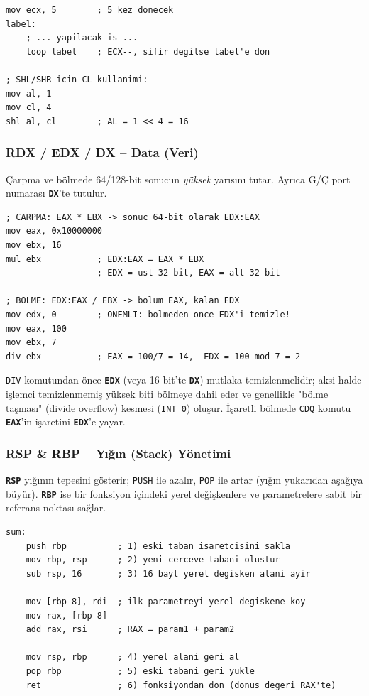 \documentclass[11pt,a4paper]{article}
\newcommand{\reg}[1]{\texttt{\color{anaMavi}\textbf{#1}}}
\newcommand{\hx}[1]{\texttt{\color{turuncu}#1}}
\newcommand{\kod}[1]{\texttt{\color{koyuGri}#1}}
\begin{document}
\begin{lstlisting}
mov ecx, 5        ; 5 kez donecek
label:
    ; ... yapilacak is ...
    loop label    ; ECX--, sifir degilse label'e don

; SHL/SHR icin CL kullanimi:
mov al, 1
mov cl, 4
shl al, cl        ; AL = 1 << 4 = 16
\end{lstlisting}

\subsubsection{RDX / EDX / DX -- Data (Veri)}
Çarpma ve bölmede 64/128-bit sonucun \emph{yüksek} yarısını tutar. Ayrıca
G/Ç port numarası \reg{DX}'te tutulur.

\begin{ornekkutu}
\begin{lstlisting}
; CARPMA: EAX * EBX -> sonuc 64-bit olarak EDX:EAX
mov eax, 0x10000000
mov ebx, 16
mul ebx           ; EDX:EAX = EAX * EBX
                  ; EDX = ust 32 bit, EAX = alt 32 bit

; BOLME: EDX:EAX / EBX -> bolum EAX, kalan EDX
mov edx, 0        ; ONEMLI: bolmeden once EDX'i temizle!
mov eax, 100
mov ebx, 7
div ebx           ; EAX = 100/7 = 14,  EDX = 100 mod 7 = 2
\end{lstlisting}
\end{ornekkutu}

\begin{uyarikutu}
\kod{DIV} komutundan önce \reg{EDX} (veya 16-bit'te \reg{DX}) mutlaka
temizlenmelidir; aksi halde işlemci temizlenmemiş yüksek biti bölmeye dahil
eder ve genellikle "bölme taşması" (divide overflow) kesmesi (\hx{INT 0}) oluşur.
İşaretli bölmede \kod{CDQ} komutu \reg{EAX}'in işaretini \reg{EDX}'e yayar.
\end{uyarikutu}

\subsubsection{RSP \& RBP -- Yığın (Stack) Yönetimi}
\reg{RSP} yığının tepesini gösterir; \kod{PUSH} ile azalır, \kod{POP} ile
artar (yığın yukarıdan aşağıya büyür). \reg{RBP} ise bir fonksiyon içindeki
yerel değişkenlere ve parametrelere sabit bir referans noktası sağlar.

\begin{ornekkutu}
\begin{lstlisting}
sum:
    push rbp          ; 1) eski taban isaretcisini sakla
    mov rbp, rsp      ; 2) yeni cerceve tabani olustur
    sub rsp, 16       ; 3) 16 bayt yerel degisken alani ayir

    mov [rbp-8], rdi  ; ilk parametreyi yerel degiskene koy
    mov rax, [rbp-8]
    add rax, rsi      ; RAX = param1 + param2

    mov rsp, rbp      ; 4) yerel alani geri al
    pop rbp           ; 5) eski tabani geri yukle
    ret               ; 6) fonksiyondan don (donus degeri RAX'te)
\end{lstlisting}
\end{ornekkutu}
\end{document}
